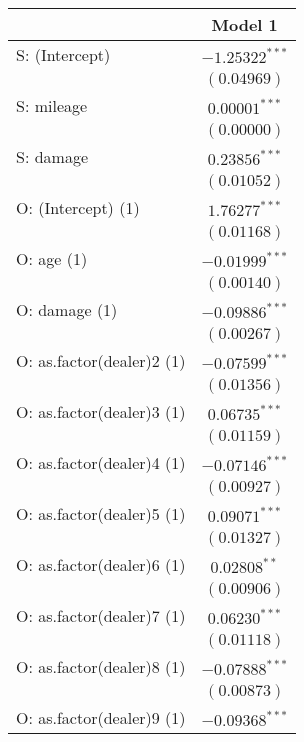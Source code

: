 
\begin{table}
\begin{center}
\begin{tiny}
\begin{tabular}{l c}
\hline
 & Model 1 \\
\hline
S: (Intercept)            & $-1.25322^{***}$ \\
                          & $(0.04969)$      \\
S: mileage                & $0.00001^{***}$  \\
                          & $(0.00000)$      \\
S: damage                 & $0.23856^{***}$  \\
                          & $(0.01052)$      \\
O: (Intercept) (1)        & $1.76277^{***}$  \\
                          & $(0.01168)$      \\
O: age (1)                & $-0.01999^{***}$ \\
                          & $(0.00140)$      \\
O: damage (1)             & $-0.09886^{***}$ \\
                          & $(0.00267)$      \\
O: as.factor(dealer)2 (1) & $-0.07599^{***}$ \\
                          & $(0.01356)$      \\
O: as.factor(dealer)3 (1) & $0.06735^{***}$  \\
                          & $(0.01159)$      \\
O: as.factor(dealer)4 (1) & $-0.07146^{***}$ \\
                          & $(0.00927)$      \\
O: as.factor(dealer)5 (1) & $0.09071^{***}$  \\
                          & $(0.01327)$      \\
O: as.factor(dealer)6 (1) & $0.02808^{**}$   \\
                          & $(0.00906)$      \\
O: as.factor(dealer)7 (1) & $0.06230^{***}$  \\
                          & $(0.01118)$      \\
O: as.factor(dealer)8 (1) & $-0.07888^{***}$ \\
                          & $(0.00873)$      \\
O: as.factor(dealer)9 (1) & $-0.09368^{***}$ \\

\end{tabular}
\end{tiny}
\end{center}
\end{table}
